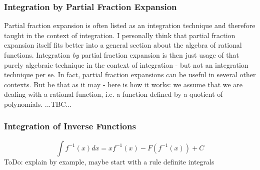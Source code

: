 \subsubsection{Integration by Partial Fraction Expansion} 
Partial fraction expansion is often listed as an integration technique and therefore taught in the context of integration. I personally think that partial fraction expansion itself fits better into a general section about the algebra of rational functions. Integration \emph{by} partial fraction expansion is then just usage of that purely algebraic technique in the context of integration - but not an integration technique per se. In fact, partial fraction expansions can be useful in several other contexts. But be that as it may - here is how it works: we assume that we are dealing with a rational function, i.e. a function defined by a quotient of polynomials. ...TBC...




\subsubsection{Integration of Inverse Functions}
\begin{equation}
\int f^{-1}(x) dx = x f^{-1}(x) - F( f^{-1}(x) ) + C
\end{equation}
ToDo: explain by example, maybe start with a rule definite integrals





